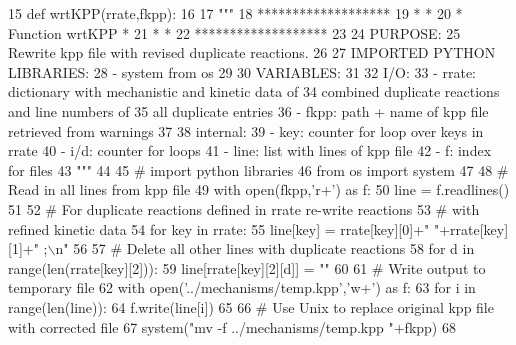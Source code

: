 \begin{DoxyCode}
15 \textcolor{keyword}{def }wrtKPP(rrate,fkpp):
16 
17     \textcolor{stringliteral}{"""}
18 \textcolor{stringliteral}{    *******************}
19 \textcolor{stringliteral}{    *                 *}
20 \textcolor{stringliteral}{    * Function wrtKPP *}
21 \textcolor{stringliteral}{    *                 *}
22 \textcolor{stringliteral}{    *******************}
23 \textcolor{stringliteral}{}
24 \textcolor{stringliteral}{    PURPOSE:}
25 \textcolor{stringliteral}{        Rewrite kpp file with revised duplicate reactions.}
26 \textcolor{stringliteral}{}
27 \textcolor{stringliteral}{    IMPORTED PYTHON LIBRARIES:}
28 \textcolor{stringliteral}{        - system from os}
29 \textcolor{stringliteral}{}
30 \textcolor{stringliteral}{    VARIABLES:}
31 \textcolor{stringliteral}{}
32 \textcolor{stringliteral}{    I/O:}
33 \textcolor{stringliteral}{        - rrate:    dictionary with mechanistic and kinetic data of}
34 \textcolor{stringliteral}{                    combined duplicate reactions and line numbers of}
35 \textcolor{stringliteral}{                    all duplicate entries}
36 \textcolor{stringliteral}{        - fkpp:     path + name of kpp file retrieved from warnings}
37 \textcolor{stringliteral}{}
38 \textcolor{stringliteral}{    internal:}
39 \textcolor{stringliteral}{        - key:      counter for loop over keys in rrate}
40 \textcolor{stringliteral}{        - i/d:      counter for loops}
41 \textcolor{stringliteral}{        - line:     list with lines of kpp file}
42 \textcolor{stringliteral}{        - f:        index for files}
43 \textcolor{stringliteral}{    """}
44 
45 \textcolor{comment}{# import python libraries}
46     \textcolor{keyword}{from} os \textcolor{keyword}{import} system
47 
48 \textcolor{comment}{# Read in all lines from kpp file}
49     with open(fkpp,\textcolor{stringliteral}{'r+'}) \textcolor{keyword}{as} f:
50         line = f.readlines()
51 
52 \textcolor{comment}{# For duplicate reactions defined in rrate re-write reactions}
53 \textcolor{comment}{# with refined kinetic data}
54         \textcolor{keywordflow}{for} key \textcolor{keywordflow}{in} rrate:
55             line[key] = rrate[key][0]+\textcolor{stringliteral}{"  "}+rrate[key][1]+\textcolor{stringliteral}{" ;\(\backslash\)n"}
56 
57 \textcolor{comment}{# Delete all other lines with duplicate reactions}
58             \textcolor{keywordflow}{for} d \textcolor{keywordflow}{in} range(len(rrate[key][2])):
59                 line[rrate[key][2][d]] = \textcolor{stringliteral}{""}
60 
61 \textcolor{comment}{# Write output to temporary file}
62     with open(\textcolor{stringliteral}{'../mechanisms/temp.kpp'},\textcolor{stringliteral}{'w+'}) \textcolor{keyword}{as} f:
63         \textcolor{keywordflow}{for} i \textcolor{keywordflow}{in} range(len(line)):
64             f.write(line[i])
65 
66 \textcolor{comment}{# Use Unix to replace original kpp file with corrected file}
67     system(\textcolor{stringliteral}{"mv -f ../mechanisms/temp.kpp "}+fkpp)
68 \end{DoxyCode}
